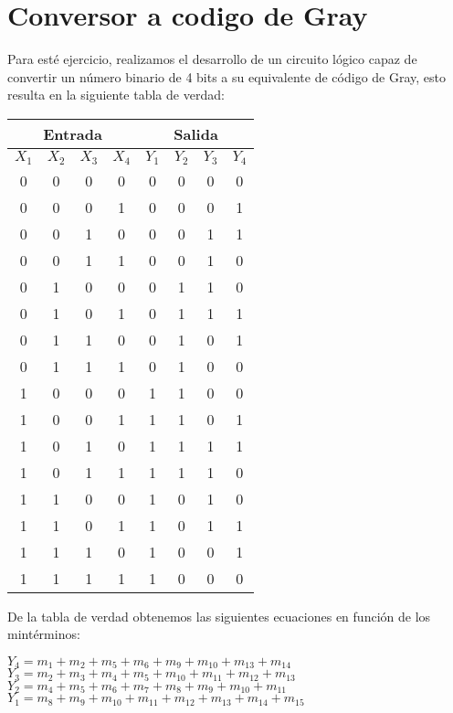 \section{Conversor a codigo de Gray}
Para esté ejercicio, realizamos el desarrollo de un circuito lógico capaz de convertir un número binario de 4 bits a su equivalente de código de Gray, esto resulta en la siguiente tabla de verdad:
\begin{table}[H]
	\begin{center}
		\begin{tabular}{|c|c|c|c||c|c|c|c|}
			\hline
			\multicolumn{4}{|c||}{Entrada} & \multicolumn{4}{|c|}{Salida}\\
			\hline
			$X_1$ &	$X_2$ &	$X_3$ &	$X_4$ & $Y_1$ & $Y_2$ & $Y_3$ & $Y_4$\\
			\hline
			0 & 0 & 0 & 0 & 0 & 0 & 0 & 0\\
			\hline
			0 & 0 & 0 & 1 & 0 & 0 & 0 & 1\\
			\hline
			0 & 0 & 1 & 0 & 0 & 0 & 1 & 1\\
			\hline
			0 & 0 & 1 & 1 & 0 & 0 & 1 & 0\\
			\hline
			0 & 1 & 0 & 0 & 0 & 1 & 1 & 0\\
			\hline
			0 & 1 & 0 & 1 & 0 & 1 & 1 & 1\\
			\hline
			0 & 1 & 1 & 0 & 0 & 1 & 0 & 1\\
			\hline
			0 & 1 & 1 & 1 & 0 & 1 & 0 & 0\\
			\hline
			1 & 0 & 0 & 0 & 1 & 1 & 0 & 0\\
			\hline
			1 & 0 & 0 & 1 & 1 & 1 & 0 & 1\\
			\hline
			1 & 0 & 1 & 0 & 1 & 1 & 1 & 1\\
			\hline
			1 & 0 & 1 & 1 & 1 & 1 & 1 & 0\\
			\hline
			1 & 1 & 0 & 0 & 1 & 0 & 1 & 0\\
			\hline
			1 & 1 & 0 & 1 & 1 & 0 & 1 & 1\\
			\hline
			1 & 1 & 1 & 0 & 1 & 0 & 0 & 1\\
			\hline
			1 & 1 & 1 & 1 & 1 & 0 & 0 & 0\\
			\hline
		\end{tabular}
	\end{center}
\end{table}
De la tabla de verdad obtenemos las siguientes ecuaciones en función de los mintérminos:
\begin{center}
	$Y_4=m_1+m_2+m_5+m_6+m_9+m_{10}+m_{13}+m_{14}$\\
	$Y_3=m_2+m_3+m_4+m_5+m_{10}+m_{11}+m_{12}+m_{13}$\\
	$Y_2=m_4+m_5+m_6+m_7+m_8+m_9+m_{10}+m_{11}$\\
	$Y_1=m_8+m_9+m_{10}+m_{11}+m_{12}+m_{13}+m_{14}+m_{15}$\\
\end{center}
